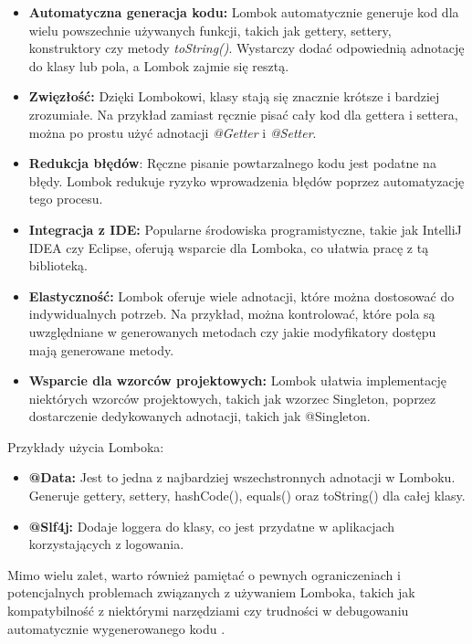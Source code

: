 \begin{itemize}
\item \textbf{Automatyczna generacja kodu:} Lombok automatycznie generuje kod dla wielu powszechnie używanych funkcji, takich jak gettery, settery, konstruktory czy metody \textit{toString()}. Wystarczy dodać odpowiednią adnotację do klasy lub pola, a Lombok zajmie się resztą.

\item \textbf{Zwięzłość:} Dzięki Lombokowi, klasy stają się znacznie krótsze i bardziej zrozumiałe. Na przykład zamiast ręcznie pisać cały kod dla gettera i settera, można po prostu użyć adnotacji \textit{@Getter} i \textit{@Setter}.

\item \textbf{Redukcja błędów}: Ręczne pisanie powtarzalnego kodu jest podatne na błędy. Lombok redukuje ryzyko wprowadzenia błędów poprzez automatyzację tego procesu.

\item \textbf{Integracja z IDE:} Popularne środowiska programistyczne, takie jak IntelliJ IDEA czy Eclipse, oferują wsparcie dla Lomboka, co ułatwia pracę z tą biblioteką.

\item \textbf{Elastyczność:} Lombok oferuje wiele adnotacji, które można dostosować do indywidualnych potrzeb. Na przykład, można kontrolować, które pola są uwzględniane w generowanych metodach czy jakie modyfikatory dostępu mają generowane metody.

\item \textbf{Wsparcie dla wzorców projektowych:} Lombok ułatwia implementację niektórych wzorców projektowych, takich jak wzorzec Singleton, poprzez dostarczenie dedykowanych adnotacji, takich jak @Singleton.
\end{itemize}

Przykłady użycia Lomboka:

\begin{itemize}
\item \textbf{@Data:} Jest to jedna z najbardziej wszechstronnych adnotacji w Lomboku. Generuje gettery, settery, hashCode(), equals() oraz toString() dla całej klasy.
\item \textbf{@Slf4j:} Dodaje loggera do klasy, co jest przydatne w aplikacjach korzystających z logowania.
\end{itemize} 
Mimo wielu zalet, warto również pamiętać o pewnych ograniczeniach i potencjalnych problemach związanych z używaniem Lomboka, takich jak kompatybilność z niektórymi narzędziami czy trudności w debugowaniu automatycznie wygenerowanego kodu \cite{lombokSpecs}.

